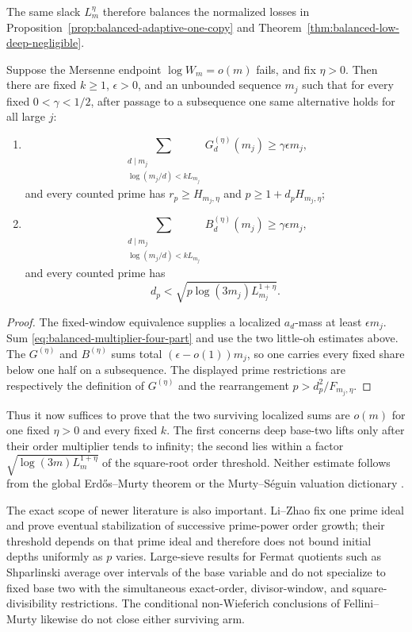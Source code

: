 The same slack $L_m^\eta$ therefore balances the normalized losses in
Proposition~\ref{prop:balanced-adaptive-one-copy} and
Theorem~\ref{thm:balanced-low-deep-negligible}.

\begin{theorem}
\label{thm:balanced-high-multiplier-two-arm}
Suppose the Mersenne endpoint $\log W_m=o(m)$ fails, and fix $\eta>0$.  Then
there are fixed $k\ge1$, $\epsilon>0$, and an unbounded sequence $m_j$ such
that for every fixed $0<\gamma<1/2$, after passage to a subsequence one same
alternative holds for all large $j$:
\begin{enumerate}
\item
\[
 \sum_{\substack{d\mid m_j\\\log(m_j/d)<kL_{m_j}}}
 G_d^{(\eta)}(m_j)\ge\gamma\epsilon m_j,
\]
and every counted prime has
$r_p\ge H_{m_j,\eta}$ and $p\ge1+d_pH_{m_j,\eta}$;
\item
\[
 \sum_{\substack{d\mid m_j\\\log(m_j/d)<kL_{m_j}}}
 B_d^{(\eta)}(m_j)\ge\gamma\epsilon m_j,
\]
and every counted prime has
\[
 d_p<\sqrt{p\log(3m_j)L_{m_j}^{1+\eta}}.
\]
\end{enumerate}
\end{theorem}

\begin{proof}
The fixed-window equivalence supplies a localized $a_d$-mass at least
$\epsilon m_j$.  Sum \eqref{eq:balanced-multiplier-four-part} and use the two
little-oh estimates above.  The $G^{(\eta)}$ and $B^{(\eta)}$ sums total
$(\epsilon-o(1))m_j$, so one carries every fixed share below one half on a
subsequence.  The displayed prime restrictions are respectively the
definition of $G^{(\eta)}$ and the rearrangement
$p>d_p^2/F_{m_j,\eta}$.
\end{proof}

Thus it now suffices to prove that the two surviving localized sums are
$o(m)$ for one fixed $\eta>0$ and every fixed $k$.  The first concerns deep
base-two lifts only after their order multiplier tends to infinity; the
second lies within a factor
$\sqrt{\log(3m)L_m^{1+\eta}}$ of the square-root order threshold.  Neither
estimate follows from the global Erd\H{o}s--Murty theorem
\cite{ErdosMurty1999} or the Murty--S\'eguin valuation dictionary
\cite{MurtySeguin2019}.

The exact scope of newer literature is also important.  Li--Zhao
\cite{LiZhao2026} fix one prime ideal and prove eventual stabilization of
successive prime-power order growth; their threshold depends on that prime
ideal and therefore does not bound initial depths uniformly as $p$ varies.
Large-sieve results for Fermat quotients such as Shparlinski
\cite{ShparlinskiFermatQuotients2011} average over intervals of the base
variable and do not specialize to fixed base two with the simultaneous
exact-order, divisor-window, and square-divisibility restrictions.  The
conditional non-Wieferich conclusions of Fellini--Murty
\cite{FelliniMurty2026} likewise do not close either surviving arm.

